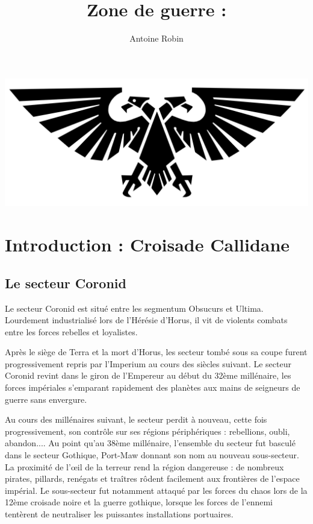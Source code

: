 \documentclass[10pt,a4paper]{book}
\author{ Antoine Robin}
\title{Zone de guerre : \zone}
\newcommand{\croisade}{Croisade Callidane }
\newcommand{\secteur}{secteur Coronid }
\begin{document}
\maketitle
\includegraphics[width=\textwidth]{aquila 2.png}
\tableofcontents
\chapter{Introduction :  \croisade}
\section{Le \secteur}
Le \secteur est situé entre les segmentum Obsucurs et Ultima. Lourdement industrialisé lors de l'Hérésie d'Horus, il vit de violents combats entre les forces rebelles et loyalistes.

Après le siège de Terra et la mort d'Horus, les secteur tombé sous sa coupe furent progressivement repris par l'Imperium au cours des siècles suivant. Le \secteur revint dans le giron de l'Empereur au début du 32ème millénaire, les forces impériales s'emparant rapidement des planètes aux mains de seigneurs de guerre sans envergure.

Au cours des millénaires suivant, le secteur perdit à nouveau, cette fois progressivement, son contrôle sur ses régions périphériques : rebellions, oubli, abandon.... Au point qu'au 38ème millénaire, l'ensemble du secteur fut basculé dans le secteur Gothique, Port-Maw donnant son nom au nouveau sous-secteur. La proximité de l'œil de la terreur rend la région dangereuse : de nombreux pirates, pillards, renégats et traîtres rôdent facilement aux frontières de l'espace impérial. Le sous-secteur fut notamment attaqué par les forces du chaos lors de la 12ème croisade noire et la guerre gothique, lorsque les forces de l'ennemi tentèrent de neutraliser les puissantes installations portuaires.
\end{document}
